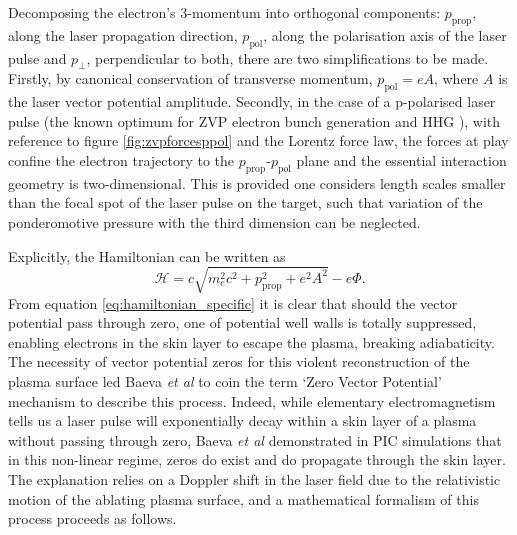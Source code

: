 Decomposing the electron's 3-momentum into orthogonal components: $p_\mathrm{prop}$, along the laser propagation direction, $p_\mathrm{pol}$, along the polarisation axis of the laser pulse and $p_\perp$, perpendicular to both, there are two simplifications to be made. Firstly, by canonical conservation of transverse momentum, $p_\mathrm{pol} = eA$, where $A$ is the laser vector potential amplitude. Secondly, in the case of a p-polarised laser pulse (the known optimum for ZVP electron bunch generation \cite{savinAttosecondscaleAbsorptionExtreme2017} and \ac{HHG} \cite{baevaTheoryHighorderHarmonic2006}), with reference to figure \ref{fig:zvpforcesppol} and the Lorentz force law, the forces at play confine the electron trajectory to the $p_\mathrm{prop}$-$p_\mathrm{pol}$ plane and the essential interaction geometry is two-dimensional. This is provided one considers length scales smaller than the focal spot of the laser pulse on the target, such that variation of the ponderomotive pressure with the third dimension can be neglected.

Explicitly, the Hamiltonian can be written as
\begin{equation}\label{eq:hamiltonian_specific}
	\mathcal{H} = c\sqrt{m^2_ec^2 + p^2_\mathrm{prop} + e^2A^2} - e\Phi.
\end{equation}
From equation \ref{eq:hamiltonian_specific} it is clear that should the vector potential pass through zero, one of potential well walls is totally suppressed, enabling electrons in the skin layer to escape the plasma, breaking adiabaticity. The necessity of vector potential zeros for this violent reconstruction of the plasma surface led Baeva \textit{et al} \cite{baevaZeroVectorPotential2011} to coin the term `Zero Vector Potential' mechanism to describe this process. Indeed, while elementary electromagnetism tells us a laser pulse will exponentially decay within a skin layer of a plasma without passing through zero, Baeva \textit{et al} \cite{baevaZeroVectorPotential2011} demonstrated in \ac{PIC} simulations that in this non-linear regime, zeros do exist and do propagate through the skin layer. The explanation relies on a Doppler shift in the laser field due to the relativistic motion of the ablating plasma surface, and a mathematical formalism of this process proceeds as follows.


